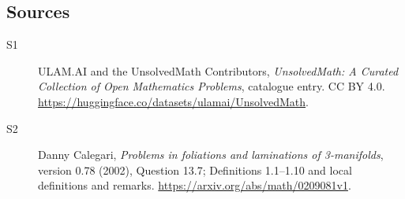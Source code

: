 \documentclass[11pt]{article}
\begin{document}
\subsection{Sources}
\begin{description}
\item[\hypertarget{source:statement:1}{S1}] ULAM.AI and the UnsolvedMath Contributors, \emph{UnsolvedMath: A Curated Collection of Open Mathematics Problems}, catalogue entry. CC BY 4.0. \url{https://huggingface.co/datasets/ulamai/UnsolvedMath}.
\item[\hypertarget{source:statement:2}{S2}] Danny Calegari, \emph{Problems in foliations and laminations of 3-manifolds}, version 0.78 (2002), Question 13.7; Definitions 1.1--1.10 and local definitions and remarks. \url{https://arxiv.org/abs/math/0209081v1}.
\end{description}
\label{end:statement}
\end{document}
